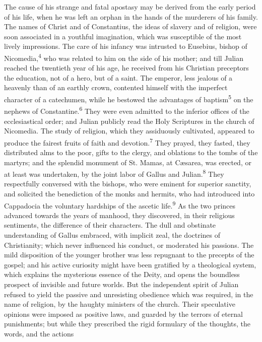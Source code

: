 The cause of his strange and fatal apostasy may be derived from
the early period of his life, when he was left an orphan in the
hands of the murderers of his family. The names of Christ and of
Constantius, the ideas of slavery and of religion, were soon
associated in a youthful imagination, which was susceptible of
the most lively impressions. The care of his infancy was
intrusted to Eusebius, bishop of Nicomedia,\textsuperscript{4} who was related to
him on the side of his mother; and till Julian reached the
twentieth year of his age, he received from his Christian
preceptors the education, not of a hero, but of a saint. The
emperor, less jealous of a heavenly than of an earthly crown,
contented himself with the imperfect character of a catechumen,
while he bestowed the advantages of baptism\textsuperscript{5} on the nephews of
Constantine.\textsuperscript{6} They were even admitted to the inferior offices of
the ecclesiastical order; and Julian publicly read the Holy
Scriptures in the church of Nicomedia. The study of religion,
which they assiduously cultivated, appeared to produce the
fairest fruits of faith and devotion.\textsuperscript{7} They prayed, they fasted,
they distributed alms to the poor, gifts to the clergy, and
oblations to the tombs of the martyrs; and the splendid monument
of St. Mamas, at Cæsarea, was erected, or at least was
undertaken, by the joint labor of Gallus and Julian.\textsuperscript{8} They
respectfully conversed with the bishops, who were eminent for
superior sanctity, and solicited the benediction of the monks and
hermits, who had introduced into Cappadocia the voluntary
hardships of the ascetic life.\textsuperscript{9} As the two princes advanced
towards the years of manhood, they discovered, in their religious
sentiments, the difference of their characters. The dull and
obstinate understanding of Gallus embraced, with implicit zeal,
the doctrines of Christianity; which never influenced his
conduct, or moderated his passions. The mild disposition of the
younger brother was less repugnant to the precepts of the gospel;
and his active curiosity might have been gratified by a
theological system, which explains the mysterious essence of the
Deity, and opens the boundless prospect of invisible and future
worlds. But the independent spirit of Julian refused to yield the
passive and unresisting obedience which was required, in the name
of religion, by the haughty ministers of the church. Their
speculative opinions were imposed as positive laws, and guarded
by the terrors of eternal punishments; but while they prescribed
the rigid formulary of the thoughts, the words, and the actions
